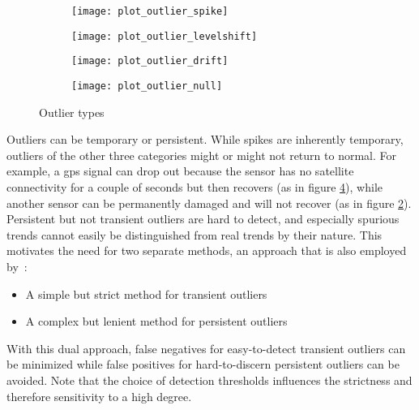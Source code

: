 \begin{figure}[h]
	\begin{subfigure}[c]{0.5\textwidth}
		\centering
		\texttt{[image: plot\_outlier\_spike]}%
		\label{fig:offcenter-spike}
	\end{subfigure}
	\begin{subfigure}[c]{0.5\textwidth}
		\centering
		\texttt{[image: plot\_outlier\_levelshift]}%
		\label{fig:outlier-type-levelshift}
	\end{subfigure}
	\begin{subfigure}[c]{0.5\textwidth}
		\centering
		\texttt{[image: plot\_outlier\_drift]}%
		\label{fig:outlier-type-drift}
	\end{subfigure}
	\begin{subfigure}[c]{0.5\textwidth}
		\centering
		\texttt{[image: plot\_outlier\_null]}%
		\label{fig:outlier-type-null}
	\end{subfigure}
	\caption{Outlier types}
	\label{fig:outlier-types}
\end{figure}

Outliers can be temporary or persistent. While spikes are inherently temporary, outliers of the other three categories might or might not return to normal. For example, a \gls{gps} signal can drop out because the sensor has no satellite connectivity for a couple of seconds but then recovers (as in figure \ref{fig:outlier-type-null}), while another sensor can be permanently damaged and will not recover (as in figure \ref{fig:outlier-type-levelshift}). Persistent but not transient outliers are hard to detect, and especially spurious trends cannot easily be distinguished from real trends by their nature. This motivates the need for two separate methods, an approach that is also employed by~\cite{Kabzan.2019}:
\begin{itemize}
\item A simple but strict method for transient outliers
\item A complex but lenient method for persistent outliers
\end{itemize}
With this dual approach, false negatives for easy-to-detect transient outliers can be minimized while false positives for hard-to-discern persistent outliers can be avoided. Note that the choice of detection thresholds influences the strictness and therefore sensitivity to a high degree.


